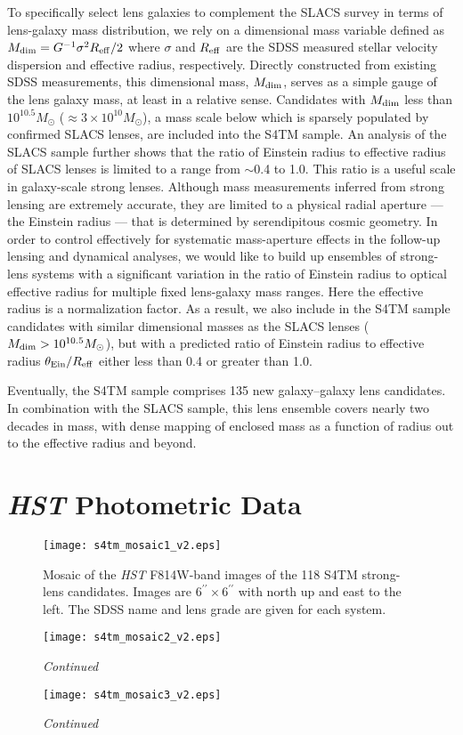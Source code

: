 \documentclass{emulateapj}
\begin{document}
To specifically select lens galaxies to complement the SLACS survey in terms of lens-galaxy 
mass distribution, we rely on a dimensional mass variable defined as 
$M_{\rm dim} = G^{-1} \sigma^2 R_{\rm eff}/2$ where $\sigma$ and $R_{\rm eff}$ are the SDSS 
measured stellar velocity dispersion and effective radius, respectively. Directly constructed 
from existing SDSS measurements, this dimensional mass, $M_{\rm dim}$, serves as a simple 
gauge of the lens galaxy mass, at least in a relative sense. 
Candidates with $M_{\rm dim}$ less than $10^{10.5} M_{\odot}$ 
($\approx 3 \times 10^{10} M_{\odot}$), a mass scale below which is sparsely populated by 
confirmed SLACS lenses, are included into the S4TM sample. 
An analysis of the SLACS sample further shows that the ratio of Einstein radius to effective 
radius of SLACS lenses is limited to a range from $\sim$0.4 to 1.0. 
This ratio is a useful scale in galaxy-scale strong lenses. Although mass measurements 
inferred from strong lensing are extremely accurate, they are limited to a physical radial 
aperture --- the Einstein radius --- that is determined by serendipitous cosmic geometry. 
In order to control effectively for systematic mass-aperture effects in the follow-up 
lensing and dynamical analyses, we would like to build up ensembles of strong-lens systems 
with a significant variation in the ratio of Einstein radius to optical effective radius 
for multiple fixed lens-galaxy mass ranges. Here the effective radius is a normalization 
factor. As a result, we also include in the S4TM sample candidates with similar dimensional 
masses as the SLACS lenses ($M_{\rm dim} > 10^{10.5} M_{\odot}$), but with a predicted ratio 
of Einstein radius to effective radius $\theta_{\rm Ein}/R_{\rm eff}$ either less than 0.4 
or greater than 1.0. 

Eventually, the S4TM sample comprises 135 new galaxy--galaxy lens candidates. In combination 
with the SLACS sample, this lens ensemble covers nearly two decades in mass, with dense 
mapping of enclosed mass as a function of radius out to the effective radius and beyond. 

\section{\textsl{HST} Photometric Data}
\label{sect:photometry}

\begin{figure*}[htbp]
	\texttt{[image: s4tm\_mosaic1\_v2.eps]}
	\caption{\label{fig:mosaic} Mosaic of the \textsl{HST} F814W-band images of the 118 S4TM strong-lens candidates. Images are $6^{\prime \prime} \times 6^{\prime \prime}$ with north up and east to the left. The SDSS name and lens grade are given for each system.}
\end{figure*}
\addtocounter{figure}{-1}
\begin{figure*}[htbp]
	\texttt{[image: s4tm\_mosaic2\_v2.eps]}
	\caption{\textit{Continued}}
\end{figure*}
\addtocounter{figure}{-1}
\begin{figure*}[htbp]
	\texttt{[image: s4tm\_mosaic3\_v2.eps]}
	\caption{\textit{Continued}}
\end{figure*}
\end{document}
